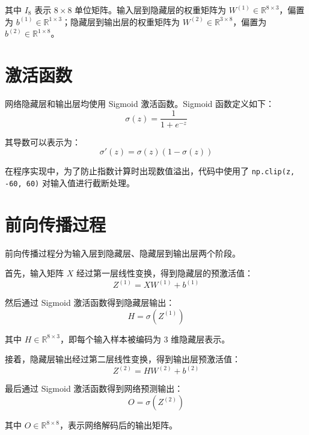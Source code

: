 \documentclass[UTF8,a4paper,12pt]{ctexart}
\begin{document}
其中 $I_8$ 表示 $8 \times 8$ 单位矩阵。输入层到隐藏层的权重矩阵为 $W^{(1)} \in \mathbb{R}^{8 \times 3}$，偏置为 $b^{(1)} \in \mathbb{R}^{1 \times 3}$；隐藏层到输出层的权重矩阵为 $W^{(2)} \in \mathbb{R}^{3 \times 8}$，偏置为 $b^{(2)} \in \mathbb{R}^{1 \times 8}$。

\section{激活函数}

网络隐藏层和输出层均使用 Sigmoid 激活函数。Sigmoid 函数定义如下：
\begin{equation}
    \sigma(z)=\frac{1}{1+e^{-z}}
\end{equation}

其导数可以表示为：
\begin{equation}
    \sigma'(z)=\sigma(z)(1-\sigma(z))
\end{equation}

在程序实现中，为了防止指数计算时出现数值溢出，代码中使用了 \verb|np.clip(z, -60, 60)| 对输入值进行截断处理。

\section{前向传播过程}

前向传播过程分为输入层到隐藏层、隐藏层到输出层两个阶段。

首先，输入矩阵 $X$ 经过第一层线性变换，得到隐藏层的预激活值：
\begin{equation}
    Z^{(1)} = XW^{(1)} + b^{(1)}
\end{equation}

然后通过 Sigmoid 激活函数得到隐藏层输出：
\begin{equation}
    H = \sigma(Z^{(1)})
\end{equation}

其中 $H \in \mathbb{R}^{8 \times 3}$，即每个输入样本被编码为 $3$ 维隐藏层表示。

接着，隐藏层输出经过第二层线性变换，得到输出层预激活值：
\begin{equation}
    Z^{(2)} = HW^{(2)} + b^{(2)}
\end{equation}

最后通过 Sigmoid 激活函数得到网络预测输出：
\begin{equation}
    O = \sigma(Z^{(2)})
\end{equation}

其中 $O \in \mathbb{R}^{8 \times 8}$，表示网络解码后的输出矩阵。
\end{document}
